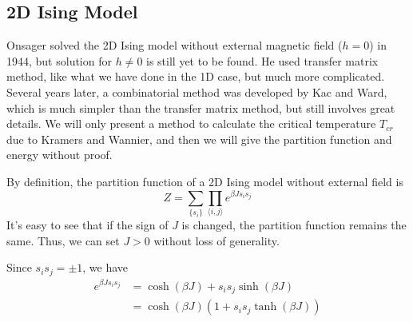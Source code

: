 \documentclass[11pt]{article}
\begin{document}
	\subsection{2D Ising Model}
	
	Onsager solved the 2D Ising model without external magnetic field ($h = 0$) in 1944\cite{onsager_solution}, but solution for $h \neq 0$ is still yet to be found. He used transfer matrix method, like what we have done in the 1D case, but much more complicated. Several years later, a combinatorial method was developed by Kac and Ward\cite{KacWard1952}, which is much simpler than the transfer matrix method, but still involves great details. We will only present a method to calculate the critical temperature $T_{cr}$ due to Kramers and Wannier\cite{KramersWannier1941}, and then we will give the partition function and energy without proof.

	By definition, the partition function of a 2D Ising model without external field is
	\begin{equation} \label{eq:PartitionFunction2D}
		Z = \sum_{\{s_i\}} \prod_{\langle i,j \rangle} e^{\beta J s_i s_j}
	\end{equation}
	It's easy to see that if the sign of $J$ is changed, the partition function remains the same. Thus, we can set $J > 0$ without loss of generality.

	Since $s_i s_j = \pm 1$, we have
	\begin{equation} \label{eq:PartitionFunction2DTransformingTrick}
		\begin{aligned}
			e^{\beta J s_i s_j} &= \cosh(\beta J) + s_i s_j \sinh(\beta J) \\
			&= \cosh(\beta J)(1 + s_i s_j \tanh(\beta J))
		\end{aligned}
	\end{equation}
\end{document}
